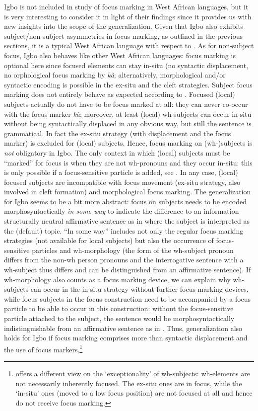 \documentclass[output=paper,colorlinks,citecolor=brown]{langscibook}
\begin{document}
Igbo is not included in  study of focus marking in West African languages, but it is very interesting to consider it in light of their findings since it provides us with new insights into the scope of the generalization. Given that Igbo also exhibits subject\slash non-subject asymmetries in focus marking, as outlined in the previous sections, it is a typical West African language with respect to . As for non-subject focus, Igbo also behaves like other West African languages: focus marking is optional here since focused elements can stay in-situ (no syntactic displacement, no orphological focus marking by \textit{k\`a}; alternatively, morphological and/or syntactic encoding is possible in the ex-situ and the cleft strategies. Subject focus marking does not entirely behave as expected according to . Focused (local) subjects actually do not have to be focus marked at all: they can never  co-occur with the focus marker \textit{k\`a}; moreover, at least (local) wh-subjects can occur in-situ without being syntactically displaced in any obvious way, but still the sentence is grammatical. In fact the ex-situ strategy (with displacement and the focus marker) is excluded for (local) subjects. Hence, focus marking on (wh-)subjects is \textit{not} obligatory in Igbo. The only context in which (local) subjects must be ``marked'' for focus is when they are not wh-pronouns and they occur in-situ: this is only possible if a  focus-sensitive particle is added, see . In any case, (local) focused subjects are incompatible with focus movement (ex-situ strategy, also involved  in cleft formation) and morphological focus marking. The generalization for Igbo seems to be a bit more abstract: focus on subjects needs to be encoded morphosyntactically \textit{in some way} to indicate the difference to an information-structurally neutral affirmative sentence as in  where the subject is interpreted as the (default) topic.  ``In some way'' includes not only the regular focus marking strategies (not available for local subjects) but also the occurrence of focus-sensitive particles and wh-morphology (the form of the wh-subject pronoun differs from the non-wh person pronouns and the interrogative sentence with a wh-subject thus differs and can be distinguished from an affirmative sentence). If wh-morphology also counts as a focus marking device, we can explain why wh-subjects can occur in the in-situ strategy without further focus marking devices, while focus subjects in the focus construction need to be accompanied by a focus particle to be able to occur in this construction: without the focus-sensitive particle attached to the subject, the sentence would be morphosyntactically indistinguishable from an affirmative sentence as in . Thus,  generalization also holds for Igbo if focus marking comprises more than syntactic displacement and the use of focus markers.\footnote{\citet{Aboh2007} offers a different view on the `exceptionality' of wh-subjects: wh-elements are not necessarily inherently focused. The ex-situ ones are in focus, while the `in-situ' ones (moved to a low focus position) are not focused at all and hence do not receive focus marking.}
\end{document}
